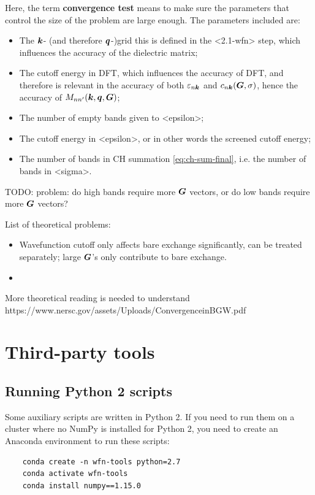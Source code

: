 \documentclass[hyperref, a4paper, 12pt]{report}
\newcommand*{\concept}[1]{{\textbf{#1}}}
\def\texttt#1{<#1>}%
\newcommand{\shortcode}[1]{\texttt{#1}}
\begin{document}
Here, the term \concept{convergence test} means 
to make sure the parameters that control the size of the problem 
are large enough. 
The parameters included are: 
\begin{itemize}
    \item The $\vb*{k}$- (and therefore $\vb*{q}$-)grid
        this is defined in the \shortcode{2.1-wfn} step,
        which influences the accuracy of the dielectric matrix;
    \item The cutoff energy in DFT, 
        which influences the accuracy of DFT, 
        and therefore is relevant in the accuracy of both 
        $\varepsilon_{n \vb*{k}}$ and $c_{n \vb*{k}}(\vb*{G}, \sigma)$,
        hence the accuracy of $M_{nn'}(\vb*{k}, \vb*{q}, \vb*{G})$;
    \item The number of empty bands given to \shortcode{epsilon}; 
    \item The cutoff energy in \shortcode{epsilon}, 
        or in other words the screened cutoff energy; 
    \item The number of bands in CH summation \eqref{eq:ch-sum-final},
        i.e. the number of bands in \shortcode{sigma}. 
\end{itemize}

TODO: problem: do high bands require more $\vb*{G}$ vectors, 
or do low bands require more $\vb*{G}$ vectors?

List of theoretical problems: 
\begin{itemize}
    \item Wavefunction cutoff only affects bare exchange 
    significantly, can be treated separately; 
    large $\vb*{G}$'s only contribute to bare exchange. 
    \item 
\end{itemize}

More theoretical reading is needed to understand
https://www.nersc.gov/assets/Uploads/ConvergenceinBGW.pdf

\section{Third-party tools}

\subsection{Running Python 2 scripts}

Some auxiliary scripts are written in Python 2. 
If you need to run them on a cluster 
where no NumPy is installed for Python 2, 
you need to create an Anaconda environment
to run these scripts:
\begin{lstlisting}
    conda create -n wfn-tools python=2.7
    conda activate wfn-tools
    conda install numpy==1.15.0
\end{lstlisting}
\end{document}
